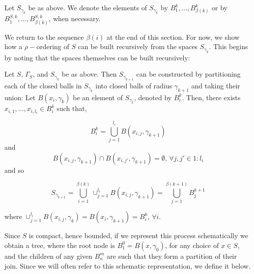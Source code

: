 \begin{notation}
Let $S_{\gamma_k}$ be as above. We denote the elements of $S_{\gamma_k}$ by $B^k_1, \ldots, B^k_{\beta(k)}$ or by $B^{S,k}_1, \ldots, B^{S,k}_{\beta(k)}$, when necessary.
\end{notation}


We return to the sequence $\beta(i)$ at the end of this section. For now, we show how a $\rho-$ordering of $S$ can be built recursively from the spaces $S_{\gamma_k}$. This begins by noting that the spaces themselves can be built recursively:\\

\begin{observation}
Let $S$, $\Gamma_S$, and $S_{\gamma_k}$ be as above. Then $S_{\gamma_{k+1}}$ can be constructed by partitioning each of the closed balls in $S_{\gamma_k}$ into closed balls of radius $\gamma_{k+1}$ and taking their union:  Let $B(x_i, \gamma_k)$  be an element of $S_{\gamma_k}$, denoted by  $B^k_i$. Then, there exists $x_{i,1},\ldots, x_{i,l_{i}} \in B^k_i$ such that,

\[B^k_i=  \bigcup_{j=1}^{l_i} B(x_{i,j}, \gamma_{k+1})\] and  \[B(x_{i,j}, \gamma_{k+1}) \cap B(x_{i,j'}, \gamma_{k+1}) = \emptyset \text{, }\forall j,j' \in 1:l_i\]
and so

\[S_{\gamma_{k+1}} =  \bigcup_{i=1}^{\beta(k)}   \cup_{j=1}^{l_i} B(x_{i,j}, \gamma_{k+1}) = \bigcup^{\beta(k+1)}_{j=1}B^{k+1}_{j}\] 


where $\cup_{j=1}^{l_i} B(x_{i,j},\gamma_{k})=B(x_i, \gamma_{k+1}) = B^k_i$, $\forall i$.
\end{observation}

Since $S$ is compact, hence bounded, if we represent this process schematically we obtain a tree, where the root node is $B^0_1=B(x,\gamma_0)$, for any choice of $x \in S$, and the children of any given $B^m_n$ are such that they form a partition of their join.  Since we will often refer to this schematic representation, we define it below.\\

